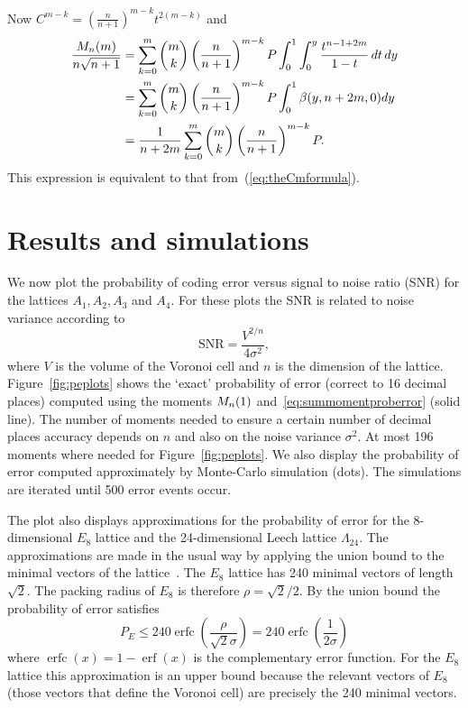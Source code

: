 \documentclass[draftcls, onecolumn, 11pt]{IEEEtran}
\begin{document}
Now $C^{m-k} = \left(\frac{n}{n+1} \right)^{m-k} t^{2(m-k)}$ and
\begin{align*}
\frac{M_n(m)}{n\sqrt{n+1}} &= \sum_{k=0}^{m} \binom{m}{k} \left(\frac{n}{n+1} \right)^{m-k} P \int_0^1 \int_0^y \frac{t^{n - 1 + 2m}}{1 - t} \, dt \, dy \\
&= \sum_{k=0}^{m} \binom{m}{k} \left(\frac{n}{n+1} \right)^{m-k} P \int_0^1 \beta(y,n+2m,0) dy \\
&= \frac{1}{n+2m} \sum_{k=0}^{m} \binom{m}{k} \left(\frac{n}{n+1} \right)^{m-k} P.
\end{align*}
This expression is equivalent to that from~(\ref{eq:theCmformula}).


\section{Results and simulations}\label{sec:results-simulations}

We now plot the probability of coding error versus signal to noise ratio (SNR) for the lattices $A_1, A_2, A_3$ and $A_4$.  For these plots the SNR is related to noise variance according to~\cite{Viterbo_diamond_cutting_1996}
\[
\text{SNR} = \frac{V^{2/n}}{4\sigma^2},
\]
where $V$ is the volume of the Voronoi cell and $n$ is the dimension of the lattice.  Figure~\ref{fig:peplots} shows the `exact' probability of error (correct to 16 decimal places) computed using the moments $M_n(1)$ and~\eqref{eq:summomentproberror} (solid line).  The number of moments needed to ensure a certain number of decimal places accuracy depends on $n$ and also on the noise variance $\sigma^2$.  At most 196 moments where needed for Figure~\ref{fig:peplots}.  We also display the probability of error computed approximately by Monte-Carlo simulation (dots).  %
The simulations are iterated until 500 error events occur.

The plot also displays approximations for the probability of error for the 8-dimensional $E_8$ lattice and the 24-dimensional Leech lattice $\Lambda_{24}$.  The approximations are made in the usual way by applying the union bound to the minimal vectors of the lattice~\cite[p.~71]{SPLAG}.  The $E_8$ lattice has 240 minimal vectors of length $\sqrt{2}$.  The packing radius of $E_8$ is therefore $\rho = \sqrt{2}/2$.  By the union bound the probability of error satisfies
\newcommand{\erfc}{\operatorname{erfc}}
\newcommand{\erf}{\operatorname{erf}}
\[
P_E \leq 240\erfc\left( \frac{\rho}{\sqrt{2}\sigma} \right) = 240\erfc\left(\frac{1}{2\sigma}\right)
\]
where $\erfc(x) = 1 - \erf(x)$ is the complementary error function.  For the $E_8$ lattice this approximation is an upper bound because the relevant vectors of $E_8$ (those vectors that define the Voronoi cell) are precisely the 240 minimal vectors.  %
\end{document}
